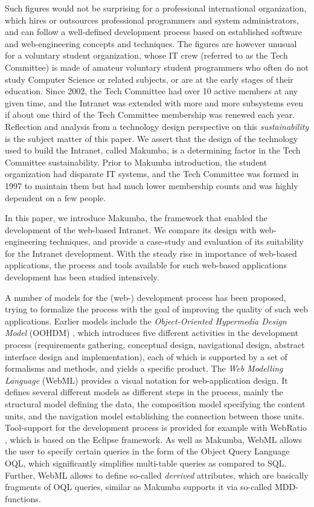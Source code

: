 \documentclass{llncs}
\begin{document}
Such figures would not be surprising for a professional international organization, which hires or outsources professional programmers and system administrators, and can follow a well-defined development process based on established software and web-engineering concepts and techniques.
The figures are however unusual for a voluntary student organization, whose IT crew (referred to as the Tech Committee) is made of amateur voluntary student programmers who often do not study Computer Science or related subjects, or are at the early stages of their education. 
Since 2002, the Tech Committee had over 10 active members at any given time, and the Intranet was extended with more and more subsystems even if about one third of the Tech Committee membership was renewed each year. Reflection and analysis from a technology design perspective on this {\it sustainability}  is the subject matter of this paper. We assert that the design of the technology used to build the Intranet, called Makumba, is a determining factor in the Tech Committee sustainability.
Prior to Makumba introduction, the student organization had disparate IT systems, and the Tech Committee was formed in 1997 to maintain them but had much lower membership counts and was highly dependent on a few people.

In this paper, we introduce Makumba, the framework that enabled the development of the web-based Intranet. We compare its design with web-engineering techniques, and provide a case-study and evaluation of its suitability for the Intranet development. With the steady rise in importance of web-based applications, the process and tools available for such web-based applications development has been studied intensively. 

A number of models for the (web-) development process has been proposed, trying to formalize the process with the goal of improving the quality of such web applications. Earlier models include the \textit{Object-Oriented Hypermedia Design Model} (OOHDM) \cite{schwabe1998ooa}, which introduces five different activities in the development process (requirements gathering, conceptual design, navigational design, abstract interface design and implementation), each of which is supported by a set of formalisms and methods, and yields a specific product. The \textit{Web Modelling Language} (WebML) \cite{Ceri00webmodeling} provides a visual notation for web-application design. It defines several different models as different steps in the process, mainly the structural model defining the data, the composition model specifying the content units, and the navigation model establishing the connection between those units. Tool-support for the development process is provided for example with WebRatio \cite{acerbis2004wit}, which is based on the Eclipse framework. As well as Makumba, WebML allows the user to specify certain queries in the form of the Object Query Language OQL, which significantly simplifies multi-table queries as compared to SQL. Further, WebML allows to define so-called \textit{derrived} attributes, which are basically fragments of OQL queries, similar as Makumba supports it via so-called MDD-functions.
\end{document}
